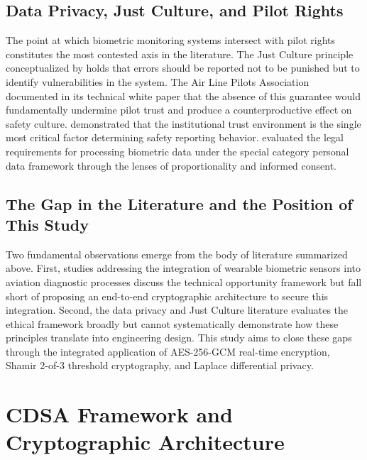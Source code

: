 \documentclass[12pt,a4paper]{article}
\begin{document}
\subsection{Data Privacy, Just Culture, and Pilot Rights}

The point at which biometric monitoring systems intersect with pilot rights constitutes the most
contested axis in the literature. The Just Culture principle conceptualized by \citet{dekker2007}
holds that errors should be reported not to be punished but to identify vulnerabilities in the system.
The Air Line Pilots Association \citeyearpar{alpa2022} documented in its technical white paper that
the absence of this guarantee would fundamentally undermine pilot trust and produce a counterproductive
effect on safety culture. \citet{ustaomer2020} demonstrated that the institutional trust environment
is the single most critical factor determining safety reporting behavior. \citet{erdinc2020}
evaluated the legal requirements for processing biometric data under the special category personal
data framework through the lenses of proportionality and informed consent.

\subsection{The Gap in the Literature and the Position of This Study}

Two fundamental observations emerge from the body of literature summarized above. First, studies
addressing the integration of wearable biometric sensors into aviation diagnostic processes discuss
the technical opportunity framework but fall short of proposing an end-to-end cryptographic
architecture to secure this integration. Second, the data privacy and Just Culture literature
evaluates the ethical framework broadly but cannot systematically demonstrate how these principles
translate into engineering design. This study aims to close these gaps through the integrated
application of AES-256-GCM real-time encryption, Shamir 2-of-3 threshold cryptography, and
Laplace differential privacy.

\section{CDSA Framework and Cryptographic Architecture}
\label{sec:framework}
\end{document}
